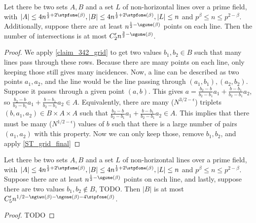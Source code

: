 \begin{theorem}
    \label{ST_grid_aux₂}
    \leanok
    Let there be two sets $A, B$ and a set $L$ of non-horizontal lines over a prime field, 
    with $|A| \leq 4n^{\frac12 + 2\stpfone(\beta)}, |B| \leq 4n^{\frac12 + 2\stpfone(\beta)}, |L| \leq n$ and $p^\beta \leq n \leq p^{2 - \beta}$.
    Additionally, suppose there are at least $n^{\frac12 - \sgone(\beta)}$ points on each line.
    Then the number of intersections is at most $C'_2 n^{\frac32 - \sgone(\beta)}$.
\end{theorem}

\begin{proof}
    \leanok
    We apply \ref{claim_342_grid} to get two values $b_1, b_2 \in B$ such that many lines pass
    through these rows. Because there are many points on each line, only keeping those still gives many
    incidences. Now, a line can be described as two points $a_1, a_2$, and the line would be the line passing through
    $(a_1, b_1), (a_2, b_2)$. Suppose it passes through a given point $(a, b)$. This gives
    $a = \frac{b_2 - b}{b_2 - b_1} a_1 + \frac{b - b_1}{b_2 - b_1} a_2$, so
    $\frac{b_2 - b}{b_2 - b_1} a_1 + \frac{b - b_1}{b_2 - b_1} a_2 \in A$. Equivalently, there are many ($N^{3/2 - \epsilon}$) triplets
    $(b, a_1, a_2) \in B \times A \times A$ such that $\frac{b_2 - b}{b_2 - b_1} a_1 + \frac{b - b_1}{b_2 - b_1} a_2 \in A$.
    This implies that there must be many ($N^{1/2 - \epsilon}$) values of $b$ such that there is a large number of pairs
    $(a_1, a_2)$ with this property. Now we can only keep those, remove $b_1, b_2$, and apply \ref{ST_grid_final}
\end{proof}

\begin{theorem}
    \label{ST_grid_final}
    \leanok
    Let there be two sets $A, B$ and a set $L$ of non-horizontal lines over a prime field, 
    with $|A| \leq 4n^{\frac12 + 2\stpfone(\beta)}, |B| \leq 4n^{\frac12 + 2\stpfone(\beta)}, |L| \leq n$ and $p^\beta \leq n \leq p^{2 - \beta}$.
    Suppose there are at least $n^{\frac12 - \sgone(\beta)}$ points on each line, and lastly,
    suppose there are two values $b_1, b_2 \notin B$, TODO.
    Then $|B|$ is at most $C'_5 n^{1/2 - \sgtwo(\beta) - \sgone(\beta) - 4 \stpfone(\beta)}$.
\end{theorem}

\begin{proof}
    \leanok
    TODO
\end{proof}

